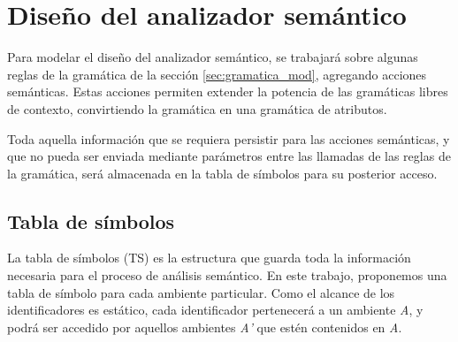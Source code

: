 

\section{Diseño del analizador semántico}
Para modelar el diseño del analizador semántico, se trabajará sobre algunas reglas de la gramática de la sección \ref{sec:gramatica_mod}, agregando acciones semánticas. Estas acciones permiten extender la potencia de las gramáticas libres de contexto, convirtiendo la gramática en una gramática de atributos.

Toda aquella información que se requiera persistir para las acciones semánticas, y que no pueda ser enviada mediante parámetros entre las llamadas de las reglas de la gramática, será almacenada en la tabla de símbolos para su posterior acceso.

\subsection{Tabla de símbolos}
La tabla de símbolos (TS) es la estructura que guarda toda la información necesaria para el proceso de análisis semántico. En este trabajo, proponemos una tabla de símbolo para cada ambiente particular.
Como el alcance de los identificadores es estático, cada identificador pertenecerá a un ambiente \emph{A}, y podrá ser accedido por aquellos ambientes \emph{A'} que estén contenidos en \emph{A}.

